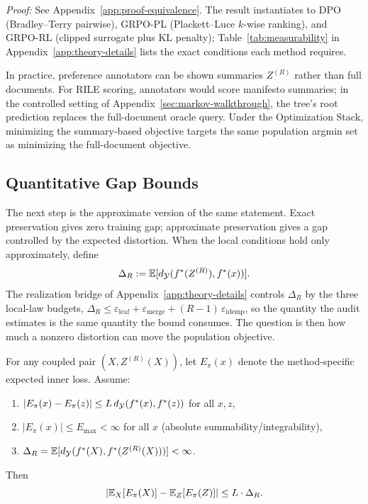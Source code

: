 \noindent\textit{Proof:} See Appendix~\ref{app:proof-equivalence}. The result instantiates to DPO (Bradley--Terry pairwise), GRPO-PL (Plackett--Luce $k$-wise ranking), and GRPO-RL (clipped surrogate plus KL penalty); Table~\ref{tab:measurability} in Appendix~\ref{app:theory-details} lists the exact conditions each method requires.

In practice, preference annotators can be shown summaries $Z^{(R)}$ rather than full documents. For RILE scoring, annotators would score manifesto summaries; in the controlled setting of Appendix~\ref{sec:markov-walkthrough}, the tree's root prediction replaces the full-document oracle query. Under the Optimization Stack, minimizing the summary-based objective targets the same population argmin set as minimizing the full-document objective.

\subsection{Quantitative Gap Bounds}

The next step is the approximate version of the same statement. Exact preservation gives zero training gap; approximate preservation gives a gap controlled by the expected distortion. When the local conditions hold only approximately, define
\[
\Delta_R := \mathbb{E}[d_{\mathcal{Y}}(f^\ast(Z^{(R)}), f^\ast(x))].
\]
The realization bridge of Appendix~\ref{app:theory-details} controls
$\Delta_R$ by the three local-law budgets,
$\Delta_R \le \varepsilon_{\mathrm{leaf}} + \varepsilon_{\mathrm{merge}} + (R-1)\,\varepsilon_{\mathrm{idemp}}$,
so the quantity the audit estimates is the same quantity the bound
consumes. The question is then how much a nonzero distortion can move
the population objective.

\begin{theorem}\label{thm:unified-gap}
For any coupled pair $(X, Z^{(R)}(X))$, let $E_\pi(x)$ denote the method-specific expected inner loss. Assume:
\begin{enumerate}[nosep]
\item $|E_\pi(x)-E_\pi(z)| \le L\,d_{\mathcal{Y}}(f^\ast(x),f^\ast(z))$ for all $x,z$,
\item $|E_\pi(x)| \le E_{\max} < \infty$ for all $x$ (absolute summability/integrability),
\item $\Delta_R = \mathbb{E}[d_{\mathcal{Y}}(f^\ast(X),f^\ast(Z^{(R)}(X)))] < \infty$.
\end{enumerate}
Then
\[
\left| \mathbb{E}_X[E_\pi(X)] - \mathbb{E}_Z[E_\pi(Z)] \right| \le L \cdot \Delta_R.
\]
\end{theorem}

